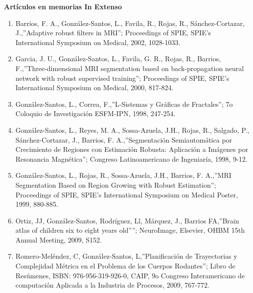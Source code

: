 {\large \textbf{Artículos en memorias In Extenso}}

\hrulefill


\begin{enumerate}

\item Barrios, F. A., González-Santos, L., Favila, R., Rojas, R., Sánchez-Cortazar, J.,”Adaptive robust 
filters in 
MRI”; Proceedings of SPIE, SPIE's International Symposium on Medical, 2002, 1028-1033.

\item Garcia, J. U., González-Santos, L., Favila, G. R., Rojas, R., Barrios, F.,”Three-dimensional MRI 
segmentation 
based on back-propagation neural network with robust supervised training”; Proceedings of SPIE, SPIE's 
International Symposium on Medical, 2000, 817-824.

\item González-Santos, L., Correa, F.,”L-Sistemas y Gráficas de Fractales”; 7o Coloquio de Investigación 
ESFM-IPN, 
1998, 247-254.

\item González-Santos, L., Reyes, M. A., Sossa-Azuela, J.H., Rojas, R., Salgado, P., Sánchez-Cortazar, J., 
Barrios, 
F. A.,”Segmentación Semiautomática por Crecimiento de Regiones con Estimación Robusta: Aplicación a Imágenes 
por Resonancia Magnética”; Congreso Latinoamericano de Ingeniaría, 1998, 9-12.

\item González-Santos, L., Rojas, R., Sossa-Azuela, J.H., Barrios, F. A.,”MRI Segmentation Based on Region 
Growing 
with Robust Estimation”; Proceedings of SPIE, SPIE's International Symposium on Medical Poster, 1999, 
880-885.

\item Ortiz, JJ, González-Santos, Rodríguez, Ll, Márquez, J., Barrios FA,”Brain atlas of children six to eight 
years 
old””; NeuroImage, Elsevier, OHBM 15th Annual Meeting, 2009, S152.

\item Romero-Meléndez, C, González-Santos, L,”Planificación de Trayectorias y Complejidad Métrica en el 
Problema de 
los Cuerpos Rodantes”; Libro de Resúmenes, ISBN: 976-956-319-926-0, CAIP, 9o Congreso Interamericano de 
computación Aplicada a la Industria de Procesos, 2009, 767-772.

\end{enumerate}

